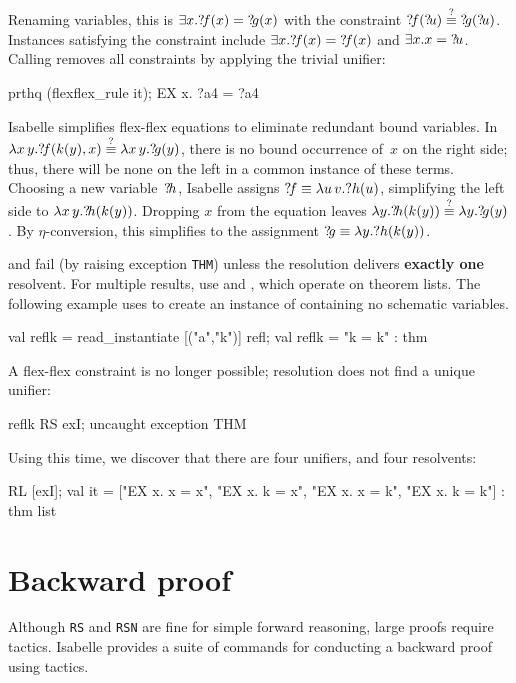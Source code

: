 \noindent
Renaming variables, this is $\exists x.{?\!f}(x)={?\!g}(x)$ with
the constraint ${{?\!f}({?\!u})\stackrel{?}{\equiv}{?\!g}({?\!u})}$.  Instances
satisfying the constraint include $\exists x.{?\!f}(x)={?\!f}(x)$ and
$\exists x.x={?\!u}$.  Calling  removes all
constraints by applying the trivial unifier:
\begin{ttbox} 
prthq (flexflex_rule it);
{\out EX x. ?a4 = ?a4}
\end{ttbox} 
Isabelle simplifies flex-flex equations to eliminate redundant bound
variables.  In $\lambda x\,y.{?\!f}(k(y),x) \stackrel{?}{\equiv} \lambda x\,y.{?\!g}(y)$,
there is no bound occurrence of~$x$ on the right side; thus, there will be
none on the left in a common instance of these terms.  Choosing a new
variable~${?\!h}$, Isabelle assigns ${?\!f}\equiv \lambda u\,v.?h(u)$,
simplifying the left side to $\lambda x\,y.{?\!h}(k(y))$.  Dropping $x$
from the equation leaves $\lambda y.{?\!h}(k(y)) \stackrel{?}{\equiv} \lambda
y.{?\!g}(y)$.  By $\eta$-conversion, this simplifies to the assignment
${?\!g}\equiv\lambda y.?h(k(y))$.

\begin{warn}
 and  fail (by raising exception \texttt{THM}) unless
the resolution delivers {\bf exactly one} resolvent.  For multiple results,
use  and , which operate on theorem lists.  The
following example uses  to create an instance
of  containing no schematic variables.
\begin{ttbox} 
val reflk = read_instantiate [("a","k")] refl;
{\out val reflk = "k = k" : thm}
\end{ttbox}

\noindent
A flex-flex constraint is no longer possible; resolution does not find a
unique unifier:
\begin{ttbox} 
reflk RS exI;
{\out uncaught exception THM}
\end{ttbox}
Using  this time, we discover that there are four unifiers, and
four resolvents:
\begin{ttbox} 
[reflk] RL [exI];
{\out val it = ["EX x. x = x", "EX x. k = x",}
{\out           "EX x. x = k", "EX x. k = k"] : thm list}
\end{ttbox} 
\end{warn}


\section{Backward proof}
Although \texttt{RS} and \texttt{RSN} are fine for simple forward reasoning,
large proofs require tactics.  Isabelle provides a suite of commands for
conducting a backward proof using tactics.


